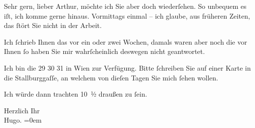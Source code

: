 \pstart
           Sehr gern, lieber Arthur, möchte ich Sie aber doch wiederſehen. So unbequem es iſt,
               ich komme gerne {\pb}hinaus.
               Vormittags einmal – ich glaube, aus früheren Zeiten, das{ }ſtört Sie nicht in der
               Arbeit.\pend
           
\pstart
           Ich{ }ſchrieb Ihnen das vor ein oder zwei Wochen, damals waren aber noch die \label{K_L02317-3v}\label{K_L02317-3} vor Ihnen{ }ſo haben Sie mir wahrſcheinlich deswegen nicht
               geantwortet.\pend
           
\pstart
           Ich bin die \label{K_L02317-4v}\label{K_L02317-4}{ }29{ }30{ }31 in Wien zur Verfügung. Bitte{ }ſchreiben {\pb}Sie auf einer Karte in
               die Stallburggaſſe, an welchem von dieſen Tagen
               Sie mich{ }ſehen wollen.\pend
           
\pstart
           Ich würde dann trachten 10 ½ draußen zu{ }ſein.\pend
           
\pstart
           Herzlich Ihr{\\[\baselineskip]}\spacefill\mbox{Hugo.}\pend
           \leftskip=0em{}\endnumbering{}  \newcommand{\dateiname}{L02317}\newcommand{\titel}{Hugo von Hofmannsthal an Arthur Schnitzler, 21. 12. [1918?]}\newcommand{\editorInnen}{Martin Anton Müller und Gerd-Hermann Susen}
